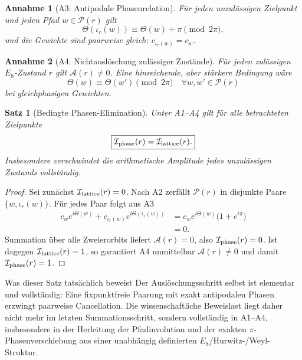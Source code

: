 \documentclass[11pt,a4paper]{article}
\newtheorem{satz}{Satz}
\newtheorem{annahme}{Annahme}
\begin{document}
\begin{annahme}[A3: Antipodale Phasenrelation]
Für jeden unzulässigen Zielpunkt und jeden Pfad $w\in\mathcal P(r)$ gilt
\[
\Theta(\iota_r(w))\equiv\Theta(w)+\pi\pmod{2\pi},
\]
und die Gewichte sind paarweise gleich: $c_{\iota_r(w)}=c_w$.
\end{annahme}

\begin{annahme}[A4: Nichtauslöschung zulässiger Zustände]
Für jeden zulässigen $E_8$-Zustand $r$ gilt $\mathcal A(r)\neq0$. Eine hinreichende, aber stärkere Bedingung wäre
\[
\Theta(w)\equiv\Theta(w')\pmod{2\pi}\quad\forall w,w'\in\mathcal P(r)
\]
bei gleichphasigen Gewichten.
\end{annahme}

\begin{satz}[Bedingte Phasen-Elimination]
Unter A1--A4 gilt für alle betrachteten Zielpunkte
\[
\boxed{\mathcal I_{\rm phase}(r)=\mathcal I_{\rm lattice}(r).}
\]
Insbesondere verschwindet die arithmetische Amplitude jedes unzulässigen Zustands vollständig.
\end{satz}

\begin{proof}
Sei zunächst $\mathcal I_{\rm lattice}(r)=0$. Nach A2 zerfällt $\mathcal P(r)$ in disjunkte Paare $\{w,\iota_r(w)\}$. Für jedes Paar folgt aus A3
\[
\begin{aligned}
c_w e^{i\Theta(w)}+c_{\iota_r(w)}e^{i\Theta(\iota_r(w))}
&=c_w e^{i\Theta(w)}\bigl(1+e^{i\pi}\bigr)\\
&=0.
\end{aligned}
\]
Summation über alle Zweierorbits liefert $\mathcal A(r)=0$, also $\mathcal I_{\rm phase}(r)=0$. Ist dagegen $\mathcal I_{\rm lattice}(r)=1$, so garantiert A4 unmittelbar $\mathcal A(r)\neq0$ und damit $\mathcal I_{\rm phase}(r)=1$.
\end{proof}

\begin{statusbox}{Was dieser Satz tatsächlich beweist}
Der Auslöschungsschritt selbst ist elementar und vollständig: Eine fixpunktfreie Paarung mit exakt antipodalen Phasen erzwingt paarweise Cancellation. Die wissenschaftliche Beweislast liegt daher nicht mehr im letzten Summationsschritt, sondern vollständig in A1--A4, insbesondere in der Herleitung der Pfadinvolution und der exakten $\pi$-Phasenverschiebung aus einer unabhängig definierten $E_8$/Hurwitz-/Weyl-Struktur.
\end{statusbox}
\end{document}
